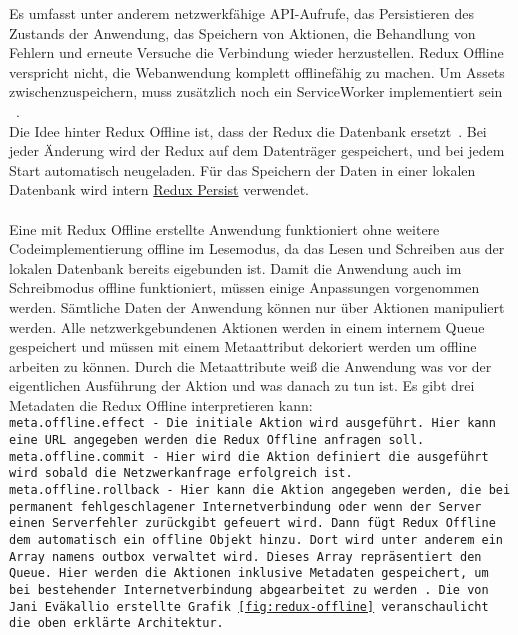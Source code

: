 Es umfasst unter anderem netzwerkfähige \gls{API}-Aufrufe, das Persistieren des Zustands der Anwendung, das Speichern von Aktionen, die Behandlung von Fehlern und erneute Versuche die Verbindung wieder herzustellen.
Redux Offline verspricht nicht, die Webanwendung komplett offlinefähig zu machen. Um \gls{Assets} zwischenzuspeichern, muss zusätzlich noch ein ServiceWorker implementiert sein ~\cite{redux-offline-gh}.\\
Die Idee hinter Redux Offline ist, dass der Redux  die Datenbank ersetzt~\cite{redux-offline}. Bei jeder Änderung wird der Redux  auf dem Datenträger gespeichert, und bei jedem Start automatisch neugeladen. Für das Speichern der Daten in einer lokalen Datenbank wird intern \hyperref[sub:reduxpersist]{Redux Persist} verwendet.\\\\
Eine mit Redux Offline erstellte Anwendung funktioniert ohne weitere Codeimplementierung offline im Lesemodus, da das Lesen und Schreiben aus der lokalen Datenbank bereits eigebunden ist.
Damit die Anwendung auch im Schreibmodus offline funktioniert, müssen einige Anpassungen vorgenommen werden.
Sämtliche Daten der Anwendung können nur über Aktionen manipuliert werden. 
Alle netzwerkgebundenen Aktionen werden  in einem internem \gls{Queue} gespeichert und müssen mit einem Metaattribut dekoriert werden um offline arbeiten zu können. Durch die Metaattribute weiß die Anwendung was vor der eigentlichen Ausführung der Aktion und was danach zu tun ist. 
Es gibt drei Metadaten die Redux Offline interpretieren kann:\\
\tt{meta.offline.effect} - Die initiale Aktion wird ausgeführt. Hier kann eine URL angegeben werden die Redux Offline anfragen soll.\\
\tt{meta.offline.commit} - Hier wird die Aktion definiert die ausgeführt wird sobald die Netzwerkanfrage erfolgreich ist.\\
\tt{meta.offline.rollback} - Hier kann die Aktion angegeben werden, die bei  permanent fehlgeschlagener Internetverbindung oder wenn der Server einen Serverfehler zurückgibt gefeuert wird.
Dann fügt Redux Offline dem  automatisch ein \tt{offline} Objekt hinzu. Dort wird unter anderem ein Array namens \tt{outbox} verwaltet wird.
Dieses Array repräsentiert den \gls{Queue}. Hier werden die Aktionen inklusive Metadaten gespeichert, um bei bestehender Internetverbindung abgearbeitet zu werden~\cite{redux-offline-docs}.
Die von Jani Eväkallio erstellte Grafik \ref{fig:redux-offline} veranschaulicht die oben erklärte Architektur.
